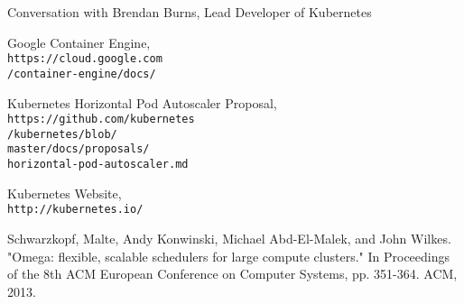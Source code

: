 \documentclass[letterpaper,11pt,twocolumn]{article}
\begin{document}
\begin{thebibliography}{9}
  Conversation with Brendan Burns, Lead Developer of Kubernetes

  Google Container Engine,\\
  \texttt{https://cloud.google.com\\/container-engine/docs/}

  Kubernetes Horizontal Pod Autoscaler Proposal,\\
  \texttt{https://github.com/kubernetes\\/kubernetes/blob/\\master/docs/proposals/\\horizontal-pod-autoscaler.md}

  Kubernetes Website,\\
  \texttt{http://kubernetes.io/}

  Schwarzkopf, Malte, Andy Konwinski, Michael Abd-El-Malek, and John Wilkes.
  "Omega: flexible, scalable schedulers for large compute clusters."
  In Proceedings of the 8th ACM European Conference on Computer Systems, pp.
  351-364. ACM, 2013.
\end{thebibliography}
\end{document}
